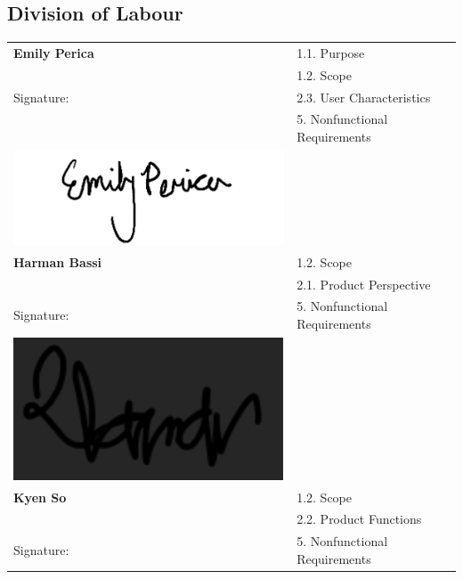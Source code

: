 \documentclass[]{article}
\begin{document}
\begin{enumerate}[{\bf BE1.}]
\appendix
\section{Division of Labour}
\label{sec:division_of_labour}
\begin{center}
\begin{tabular}{|l|l|}
     \hline
     {\bf Emily Perica} & 1.1. Purpose \\
      & 1.2. Scope \\
     Signature: & 2.3. User Characteristics \\
      & 5. Nonfunctional Requirements \\
      \includegraphics{Graphics/emily.png} &  \\
     \hline
     {\bf Harman Bassi} & 1.2. Scope \\ 
      &  2.1. Product Perspective\\
      Signature: & 5. Nonfunctional Requirements \\
      \includegraphics{Graphics/harman.png} &  \\
     \hline
      {\bf Kyen So} & 1.2. Scope \\ 
      &  2.2. Product Functions\\
      Signature: & 5. Nonfunctional Requirements \\

\end{tabular}
\end{center}
\end{enumerate}
\end{document}
